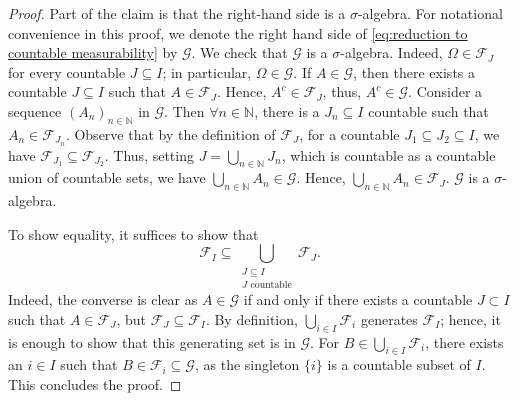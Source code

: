 \documentclass[11pt,a4paper,twoside,openany]{report}
\numberwithin{equation}{section}
\theoremstyle{plain} %
\theoremstyle{definition} %
\theoremstyle{remark} %
\begin{document}
\begin{proof}
 Part of the claim is that the right-hand side is a \(\sigma\)-algebra. For notational convenience in this proof, we denote the right hand side of \eqref{eq:reduction to countable measurability} by \(\mathcal{G}\). We check that \(\mathcal{G}\) is a \(\sigma\)-algebra.
 Indeed, \(\Omega\in \mathcal{F}_J\) for every countable \(J\subseteq I\); in particular, \(\Omega\in \mathcal{G}\). If \(A\in\mathcal{G}\), then there exists a countable \(J\subseteq I\) such that \(A\in\mathcal{F}_J\). Hence, \(A^c\in\mathcal{F}_J\), thus, \(A^c\in\mathcal{G}\). Consider a sequence \((A_n)_{n\in\mathbb{N}}\) in \(\mathcal{G}\). 
 Then \(\forall n\in\mathbb{N}\), there is a \(J_n\subseteq I\) countable such that \(A_n\in \mathcal{F}_{J_n}\). Observe that by the definition of \(\mathcal{F}_J\), for a countable \(J_1\subseteq J_2\subseteq I\), we have \(\mathcal{F}_{J_1}\subseteq\mathcal{F}_{J_2}\). Thus, setting \(J=\bigcup_{n\in\mathbb{N}}J_n\), which is countable as a countable union of countable sets, we have \(\bigcup_{n\in\mathbb{N}}A_n\in\mathcal{G}\). Hence, \(\bigcup_{n\in\mathbb{N}}A_n\in\mathcal{F}_{J}\). \(\mathcal{G}\) is a \(\sigma\)-algebra. 



 To show equality, it suffices to show that 
 \begin{equation*}
     \mathcal{F}_I\subseteq \bigcup_{\substack{J\subseteq I\\ J\text{ countable}}}\mathcal{F}_J.
 \end{equation*}
Indeed, the converse is clear as \(A\in\mathcal{G}\) if and only if there exists a countable \(J\subset I\) such that \(A\in\mathcal{F}_J\), but \(\mathcal{F}_J\subseteq \mathcal{F}_I\).
By definition, \(\bigcup_{i\in I}\mathcal{F}_i\) generates \(\mathcal{F}_I\); hence, it is enough to show that this generating set is in \(\mathcal{G}\). For \(B\in\bigcup_{i\in I}\mathcal{F}_i\), there exists an \(i\in I\) such that \(B\in \mathcal{F}_i\subseteq\mathcal{G}\), as the singleton \(\{i\}\) is a countable subset of \(I\). This concludes the proof. 
\end{proof}
 
\end{document}
